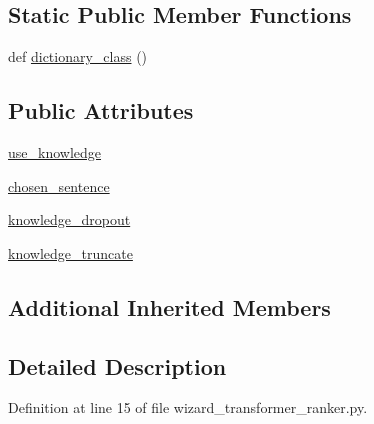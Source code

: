 \subsection*{Static Public Member Functions}
\begin{DoxyCompactItemize}
\item 
def \hyperlink{classwizard__transformer__ranker_1_1wizard__transformer__ranker_1_1WizardTransformerRankerAgent_ab871cd99b32921aa5aa96306ad0818a6}{dictionary\+\_\+class} ()
\end{DoxyCompactItemize}
\subsection*{Public Attributes}
\begin{DoxyCompactItemize}
\item 
\hyperlink{classwizard__transformer__ranker_1_1wizard__transformer__ranker_1_1WizardTransformerRankerAgent_abc63c5b7c845a649dddfcd299e6eee9d}{use\+\_\+knowledge}
\item 
\hyperlink{classwizard__transformer__ranker_1_1wizard__transformer__ranker_1_1WizardTransformerRankerAgent_acc557e4adccf7091b3fb2fa5590767bd}{chosen\+\_\+sentence}
\item 
\hyperlink{classwizard__transformer__ranker_1_1wizard__transformer__ranker_1_1WizardTransformerRankerAgent_a6892f7cd65221d96a84df9e21d69016f}{knowledge\+\_\+dropout}
\item 
\hyperlink{classwizard__transformer__ranker_1_1wizard__transformer__ranker_1_1WizardTransformerRankerAgent_a42a95bfa4e6c44c2dbab8f07586b3e1a}{knowledge\+\_\+truncate}
\end{DoxyCompactItemize}
\subsection*{Additional Inherited Members}


\subsection{Detailed Description}


Definition at line 15 of file wizard\+\_\+transformer\+\_\+ranker.\+py.




